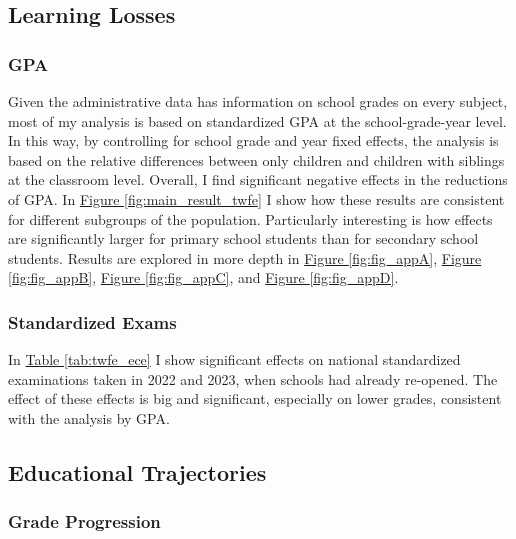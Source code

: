 \subsection{Learning Losses}


\subsubsection{GPA}

Given the administrative data has information on school grades on every subject, most of my analysis is based on standardized GPA at the school-grade-year level. In this way, by controlling for school grade and year fixed effects, the analysis is based on the relative differences between only children and children with siblings at the classroom level. Overall, I find significant negative effects in the reductions of GPA.  In \hyperref[fig:main_result_twfe]{Figure \ref{fig:main_result_twfe}} I show how these results are consistent for different subgroups of the population. Particularly interesting is how effects are significantly larger for primary school students than for secondary school students. Results are explored in more depth in \hyperref[fig:fig_appA]{Figure \ref{fig:fig_appA}}, \hyperref[fig:fig_appB]{Figure \ref{fig:fig_appB}}, \hyperref[fig:fig_appC]{Figure \ref{fig:fig_appC}}, and \hyperref[fig:fig_appD]{Figure \ref{fig:fig_appD}}.

\subsubsection{Standardized Exams}

In \hyperref[tab:twfe_ece]{Table \ref{tab:twfe_ece}}
I show significant effects on national standardized examinations taken in 2022 and 2023, when schools had already re-opened. The effect of these effects is big and significant, especially on lower grades, consistent with the analysis by GPA.

\subsection{Educational Trajectories}

\subsubsection{Grade Progression} 

